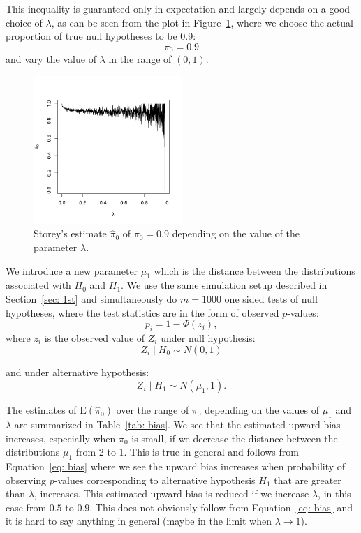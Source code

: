 \documentclass[10pt]{article}
\begin{document}
This inequality is guaranteed only in expectation and largely depends on a good choice of $\lambda$, as can be seen from the plot in Figure~\ref{fig: pi0_of_lambda}, where we choose the actual proportion of true null hypotheses to be 0.9: 
\begin{equation}
\pi_{0} = 0.9
\end{equation}
and vary the value of $\lambda$ in the range of $(0, 1)$. 

\begin{figure}[H]
	\centering
	\includegraphics[width=0.5\textwidth]{pi0_of_lambda.pdf}
	\caption{Storey's estimate $\widehat{\pi}_{0}$ of $\pi_{0} = 0.9$ depending on the value of the parameter $\lambda$.}
	\label{fig: pi0_of_lambda}	
\end{figure}

We introduce a new parameter $\mu_{1}$ which is the distance between the distributions associated with $H_{0}$ and $H_{1}$. We use the same simulation setup described in Section~\ref{sec: 1st} and simultaneously do $m = 1000$ one sided tests of null hypotheses, where the test statistics are in the form of observed $p$-values:
\begin{equation}
p_{i} = 1 - \Phi(z_{i}), %
\end{equation}
where $z_{i}$ is the observed value of $Z_{i}$ under null hypothesis:
\begin{equation}
	Z_{i} \mid H_{0} \sim N(0, 1)
\end{equation} 

and under alternative hypothesis: 
\begin{equation}
	Z_{i} \mid H_{1} \sim N(\mu_{1}, 1).
\end{equation}

The estimates of $\text{E}(\widehat{\pi}_{0})$ over the range of $\pi_{0}$ depending on the values of $\mu_{1}$ and $\lambda$ are summarized in Table~\ref{tab: bias}. We see that the estimated upward bias increases, especially when $\pi_{0}$ is small, if we decrease the distance between the distributions $\mu_{1}$ from 2 to 1. This is true in general and follows from Equation~\ref{eq: bias} where we see the upward bias increases when probability of observing $p$-values corresponding to alternative hypothesis $H_{1}$ that are greater than $\lambda$, increases. This estimated upward bias is reduced if we increase $\lambda$, in this case from $0.5$ to $0.9$. This does not obviously follow from Equation~\ref{eq: bias} and it is hard to say anything in general (maybe in the limit when $\lambda \rightarrow 1$).
\end{document}
